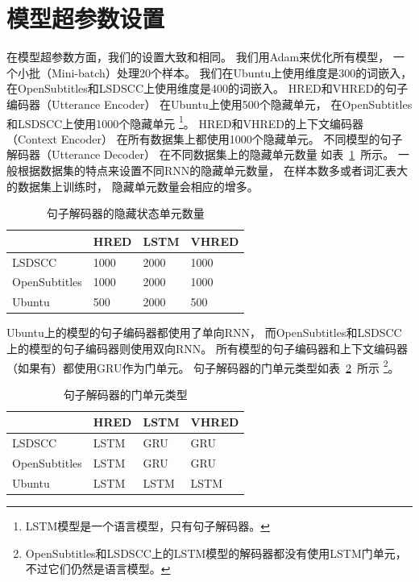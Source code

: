 \section{模型超参数设置}\label{sec:model_hparams}
在模型超参数方面，我们的设置大致和\cite{VHRED}相同。
我们用Adam来优化所有模型，
一个小批（Mini-batch）处理20个样本。
我们在Ubuntu上使用维度是300的词嵌入，
在OpenSubtitles和LSDSCC上使用维度是400的词嵌入。
HRED和VHRED的句子编码器（Utterance Encoder）
在Ubuntu上使用500个隐藏单元，
在OpenSubtitles和LSDSCC上使用1000个隐藏单元
\footnote{LSTM模型是一个语言模型，只有句子解码器。}。
HRED和VHRED的上下文编码器（Context Encoder）
在所有数据集上都使用1000个隐藏单元。
不同模型的句子解码器（Utterance Decoder）
在不同数据集上的隐藏单元数量
如表~\ref{tab:utterance_decoder_hidden_units}~所示。
一般根据数据集的特点来设置不同RNN的隐藏单元数量，
在样本数多或者词汇表大的数据集上训练时，
隐藏单元数量会相应的增多。

\begin{table}[H]
    \centering
    \caption{句子解码器的隐藏状态单元数量}
    \label{tab:utterance_decoder_hidden_units}
    \begin{tabular}{llll}
        \toprule
        \midrule
        & HRED & LSTM & VHRED \\
        \midrule
        LSDSCC & 1000 & 2000 & 1000 \\
        OpenSubtitles & 1000 & 2000 & 1000 \\
        Ubuntu & 500 & 2000 & 500 \\
        \bottomrule
    \end{tabular}
\end{table}

Ubuntu上的模型的句子编码器都使用了单向RNN，
而OpenSubtitles和LSDSCC上的模型的句子编码器则使用双向RNN。
所有模型的句子编码器和上下文编码器（如果有）都使用GRU作为门单元。
句子解码器的门单元类型如表~\ref{tab:utterance_decoder_gate_types}~所示
\footnote{OpenSubtitles和LSDSCC上的LSTM模型的解码器都没有使用LSTM门单元，不过它们仍然是语言模型。}。
\begin{table}[H]
    \centering
    \caption{句子解码器的门单元类型}
    \label{tab:utterance_decoder_gate_types}
    \begin{tabular}{llll}
        \toprule
        \midrule
        & HRED & LSTM & VHRED \\
        \midrule
        LSDSCC & LSTM & GRU & GRU \\
        OpenSubtitles & LSTM & GRU & GRU \\
        Ubuntu & LSTM & LSTM & LSTM \\
        \bottomrule
    \end{tabular}
\end{table}

